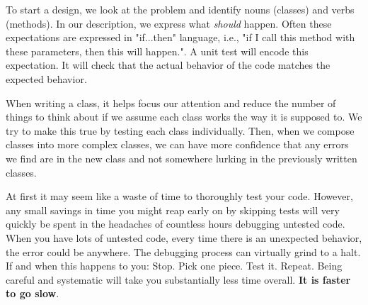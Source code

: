 To start a design, we look at the problem and identify nouns (classes) and verbs (methods).  In our description, we express what \emph{should} happen.  Often these expectations are expressed in "if...then" language, i.e., "if I call this method with these parameters, then this will happen.". A unit test will encode this expectation.  It will check that the actual behavior of the code matches the expected behavior.


When writing a class, it helps focus our attention and reduce the number of things to think about if we assume each class works the way it is supposed to.  We try to make this true by testing each class individually.  Then, when we compose classes into more complex classes, we can have more confidence that any errors we find are in the new class and not somewhere lurking in the previously written classes.  


At first it may seem like a waste of time to thoroughly test your code.  However, any small savings in time you might reap early on by skipping tests will very quickly be spent in the headaches of countless hours debugging untested code.  When you have lots of untested code, every time there is an unexpected behavior, the error could be anywhere.  The debugging process can virtually grind to a halt.  If and when this happens to you: Stop. Pick one piece. Test it. Repeat.  Being careful and systematic will take you substantially less time overall. \textbf{It is faster to go slow}.
